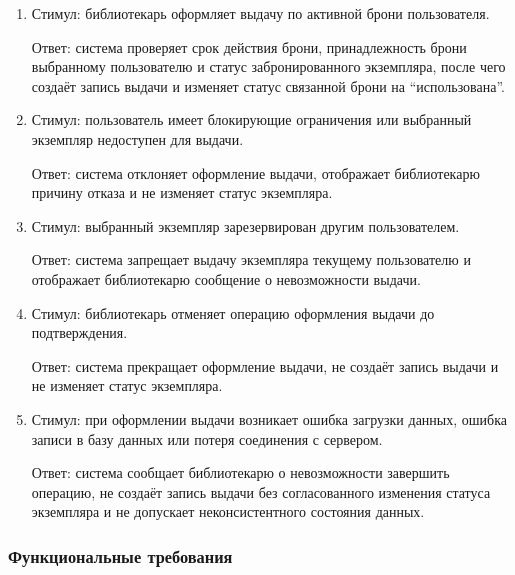 \documentclass[12pt,a4paper]{article}
\begin{document}
\begin{enumerate}
		\item Стимул: библиотекарь оформляет выдачу по активной брони пользователя.
		
		Ответ: система проверяет срок действия брони, принадлежность брони выбранному
		пользователю и статус забронированного экземпляра, после чего создаёт запись
		выдачи и изменяет статус связанной брони на ``использована''.
		
		\item Стимул: пользователь имеет блокирующие ограничения или выбранный экземпляр
		недоступен для выдачи.
		
		Ответ: система отклоняет оформление выдачи, отображает библиотекарю причину
		отказа и не изменяет статус экземпляра.
		
		\item Стимул: выбранный экземпляр зарезервирован другим пользователем.
		
		Ответ: система запрещает выдачу экземпляра текущему пользователю и отображает
		библиотекарю сообщение о невозможности выдачи.
		
		\item Стимул: библиотекарь отменяет операцию оформления выдачи до подтверждения.
		
		Ответ: система прекращает оформление выдачи, не создаёт запись выдачи
		и не изменяет статус экземпляра.
		
		\item Стимул: при оформлении выдачи возникает ошибка загрузки данных, ошибка
		записи в базу данных или потеря соединения с сервером.
		
		Ответ: система сообщает библиотекарю о невозможности завершить операцию,
		не создаёт запись выдачи без согласованного изменения статуса экземпляра
		и не допускает неконсистентного состояния данных.
	\end{enumerate}
	
	\subsubsection{Функциональные требования}
	
\end{document}
